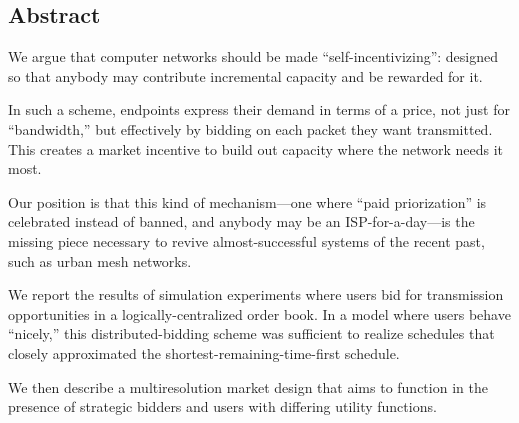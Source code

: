 \subsection*{Abstract}
We argue that computer networks should be made ``self-incentivizing'':
designed so that anybody may contribute incremental capacity and be
rewarded for it.

In such a scheme, endpoints express their demand in terms of a price,
not just for ``bandwidth,'' but effectively by bidding on each packet
they want transmitted. This creates a market incentive to build out
capacity where the network needs it most.

Our position is that this kind of mechanism---one where ``paid
priorization'' is celebrated instead of banned, and anybody may be an
ISP-for-a-day---is the missing piece necessary to revive
almost-successful systems of the recent past, such as urban mesh
networks.

We report the results of simulation experiments where users bid for
transmission opportunities in a logically-centralized order book. In a
model where users behave ``nicely,'' this distributed-bidding scheme
was sufficient to realize schedules that closely approximated the
shortest-remaining-time-first schedule.

We then describe a multiresolution market design that aims to function
in the presence of strategic bidders and users with differing utility functions.
